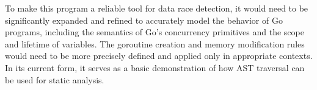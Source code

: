 \documentclass[12pt]{article}
\begin{document}
To make this program a reliable tool for data race detection, it would need to be significantly expanded and refined to accurately model the behavior of Go programs, including the semantics of Go's concurrency primitives and the scope and lifetime of variables. The goroutine creation and memory modification rules would need to be more precisely defined and applied only in appropriate contexts. In its current form, it serves as a basic demonstration of how AST traversal can be used for static analysis.

\nocite{*}


\end{document}
